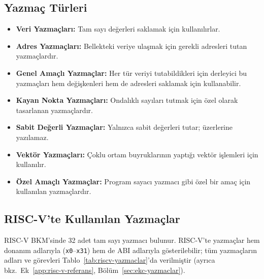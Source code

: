 \subsection{Yazmaç Türleri}

\begin{itemize}
\item \textbf{Veri Yazmaçları:} Tam sayı değerleri saklamak için kullanılırlar.
\item \textbf{Adres Yazmaçları:} Bellekteki veriye ulaşmak için gerekli adresleri tutan yazmaçlardır.
\item \textbf{Genel Amaçlı Yazmaçlar:} Her tür veriyi tutabildikleri için derleyici bu yazmaçları hem değişkenleri hem de adresleri saklamak için kullanabilir.
\item \textbf{Kayan Nokta Yazmaçları:} Ondalıklı sayıları tutmak için özel olarak tasarlanan yazmaçlardır.
\item \textbf{Sabit Değerli Yazmaçlar:} Yalnızca sabit değerleri tutar; üzerlerine yazılamaz.
\item \textbf{Vektör Yazmaçları:} Çoklu ortam buyruklarının yaptığı vektör işlemleri için kullanılır.
\item \textbf{Özel Amaçlı Yazmaçlar:} Program sayacı yazmacı gibi özel bir amaç için kullanılan yazmaçlardır.
\end{itemize}

\subsection{RISC-V'te Kullanılan Yazmaçlar}

RISC-V BKM'sinde 32 adet tam sayı yazmacı bulunur. RISC-V'te yazmaçlar hem donanım adlarıyla (\texttt{x0}--\texttt{x31}) hem de ABI adlarıyla gösterilebilir; tüm yazmaçların adları ve görevleri Tablo~\ref{tab:riscv-yazmaclar}'da verilmiştir (ayrıca bkz.\ Ek~\ref{app:risc-v-referans}, Bölüm~\ref{sec:ekc-yazmaclar}).

